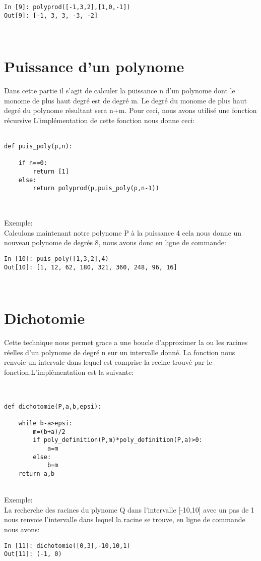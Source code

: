 \documentclass{exam}
\newenvironment{DDbox}[1]{
\begin{lrbox}{\BBbox}\begin{minipage}{\linewidth}}
{\end{minipage}\end{lrbox}\noindent\colorbox{Zgris}{\usebox{\BBbox}} \\
[.5cm]}
\begin{document}
\begin{DDbox}{\linewidth}
\begin{Verbatim}
In [9]: polyprod([-1,3,2],[1,0,-1])
Out[9]: [-1, 3, 3, -3, -2]
\end{Verbatim}
\end{DDbox}

\section{Puissance d'un polynome}
Dans cette partie il s'agit de calculer la puissance n d'un polynome dont le monome de plus haut degré est de degré m. Le degré du monome de plus haut degré du polynome résultant sera n+m. Pour ceci, nous avons utilisé une fonction récursive L'implémentation de cette fonction nous donne ceci:\\\\

\begin{DDbox}{\linewidth}
\begin{Verbatim}
def puis_poly(p,n):

	if n==0: 
		return [1]
	else: 
		return polyprod(p,puis_poly(p,n-1))


\end{Verbatim}
\end{DDbox}
Exemple:\\ Calculons maintenant notre polynome P à la puissance 4 cela nous donne un nouveau polynome de degrés 8, nous avons donc en ligne de commande:\\

\begin{DDbox}{\linewidth}
\begin{Verbatim}
In [10]: puis_poly([1,3,2],4)
Out[10]: [1, 12, 62, 180, 321, 360, 248, 96, 16]
\end{Verbatim}
\end{DDbox}

\section{Dichotomie}
Cette technique nous permet grace a une boucle d'approximer la ou les racines réelles d'un polynome de degré n sur un intervalle donné. La fonction nous renvoie un intervale dans lequel est comprise la recine trouvé par le fonction.L'implémentation est la suivante:\\\\

\begin{DDbox}{\linewidth}
\begin{Verbatim}

def dichotomie(P,a,b,epsi):

	while b-a>epsi:
		m=(b+a)/2
		if poly_definition(P,m)*poly_definition(P,a)>0:
			a=m
		else:
			b=m
	return a,b

\end{Verbatim}
\end{DDbox}
Exemple:\\ La recherche des racines du plynome Q dans l'intervalle [-10,10] avec un pas de 1 nous renvoie l'intervalle dans lequel la racine se trouve, en ligne de commande nous avons:\\

\begin{DDbox}{\linewidth}
\begin{Verbatim}
In [11]: dichotomie([0,3],-10,10,1)
Out[11]: (-1, 0)
\end{Verbatim}
\end{DDbox}
\end{document}
